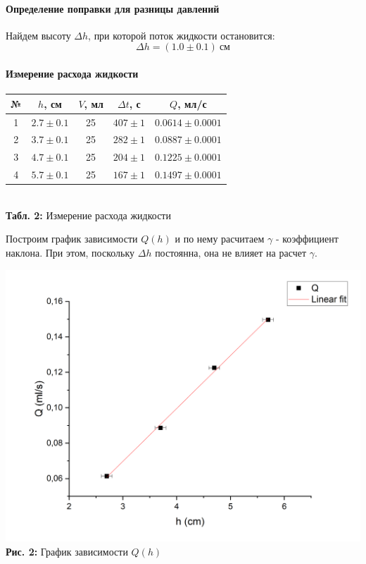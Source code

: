 \documentclass[12pt,a4paper]{scrartcl}
\begin{document}
	\paragraph{Определение поправки для разницы давлений} \hfill
	
	\par Найдем высоту $\Delta h$, при которой поток жидкости остановится:
	$$\Delta h = (1.0 \pm 0.1)\ \text{см}$$
	
	\paragraph{Измерение расхода жидкости} \hfill
	
	\begin{center}
		\begin{tabular}{|c|c|c|c|c|}
			\hline
			№ & $h$, см & $V$, мл & $\Delta t$, с & $Q$, мл/с \\\hline
			1 & $2.7 \pm 0.1$ & 25 & $407 \pm 1$ & $0.0614 \pm 0.0001$\\\hline
			2 & $3.7 \pm 0.1$ & 25 & $282 \pm 1$ & $0.0887 \pm 0.0001$\\\hline
			3 & $4.7 \pm 0.1$ & 25 & $204 \pm 1$ & $0.1225 \pm 0.0001$\\\hline
			4 & $5.7 \pm 0.1$ & 25 & $167 \pm 1$ & $0.1497 \pm 0.0001$\\\hline
		\end{tabular}
		\\\textbf{Табл. 2:} Измерение расхода жидкости
	\end{center}
	
	Построим график зависимости $Q(h)$ и по нему расчитаем $\gamma$ - коэффициент наклона. При этом, поскольку $\Delta h$ постоянна, она не влияет на расчет $\gamma$.
	
	\begin{center}
		\includegraphics[scale=0.5]{PIC_2.png}
		\\\textbf{Рис. 2: } График зависимости $Q(h)$
	\end{center}
\end{document}
